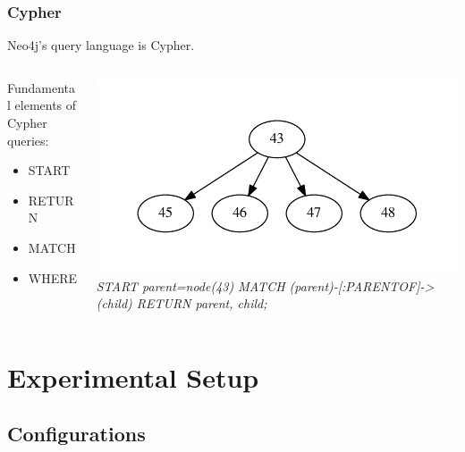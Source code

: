 \documentclass{beamer}
\begin{document}
\begin{frame}
	\frametitle{Cypher}
	Neo4j's query language is Cypher.
	\begin{columns}
	\begin{column}{0.40\textwidth}

	Fundamental elements of Cypher queries:
		\begin{itemize}
		\item START
		\item RETURN
		\item MATCH
		\item WHERE
		\end{itemize}
	\end{column}
	\begin{column}{0.60\textwidth}

	\includegraphics[width=.95\textwidth]{parents.pdf}
	\linebreak
	\emph{
START parent=node(43)
\linebreak
MATCH (parent)-[:PARENTOF]->(child)
\linebreak
RETURN parent, child;
}

	\end{column}	
	\end{columns}
\end{frame}

\section[Setup]{Experimental Setup}

\subsection{Configurations}
\end{document}
